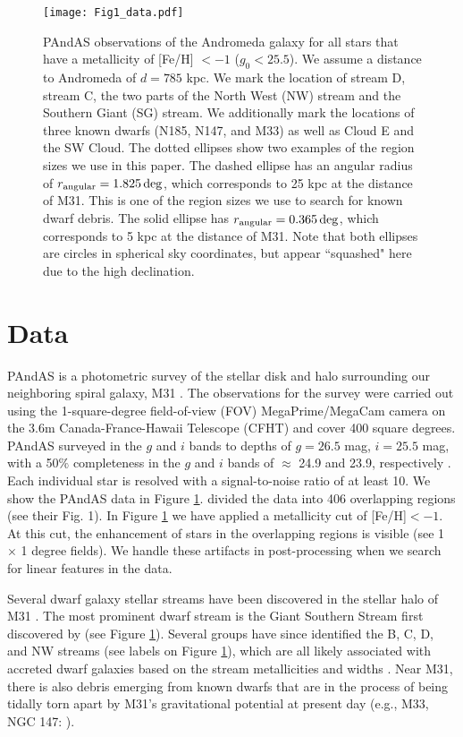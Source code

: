 \documentclass[twocolumn]{aastex631}
\begin{document}
\begin{figure}[htp]
\centerline{\texttt{[image: Fig1\_data.pdf]}}
\caption{PAndAS observations of the Andromeda galaxy for all stars that have a metallicity of [Fe/H] $<-1$ ($g_0 < 25.5$).  We assume a distance to Andromeda of $d = 785$ kpc.  We mark the location of stream D, stream C, the two parts of the North West (NW) stream and the Southern Giant (SG) stream. We additionally mark the locations of three known dwarfs (N185, N147, and M33) as well as Cloud E and the SW Cloud. The dotted ellipses show two examples of the region sizes we use in this paper. The dashed ellipse has an angular radius of $r_{\rm angular} = 1.825 \deg$, which corresponds to 25 kpc at the distance of M31.  This is one of the region sizes we use to search for known dwarf debris. The solid ellipse has $r_{\rm angular} = 0.365 \deg$, which corresponds to 5 kpc at the distance of M31. Note that both ellipses are circles in spherical sky coordinates, but appear ``squashed" here due to the high declination. 
}
\label{fig:m31}
\end{figure}

\section{Data}\label{sec:data}
PAndAS is a photometric survey of the stellar disk and halo surrounding our neighboring spiral galaxy, M31 \citep{mcconnachie2009,McConnachie18}. The observations for the survey were carried out using the 1-square-degree field-of-view (FOV) MegaPrime/MegaCam camera on the 3.6m Canada-France-Hawaii Telescope (CFHT) and cover 400 square degrees. PAndAS surveyed in the $g$ and $i$ bands to
depths of $g = 26.5$ mag, $i = 25.5$ mag, with a 50$\%$ completeness in the $g$ and $i$ bands of $\approx$ 24.9 and 23.9, respectively \citep[see Figure 4 in][]{martin16}. Each individual star is resolved with a signal-to-noise ratio of at least 10. We show the PAndAS data \citep[][]{ibata14} in Figure \ref{fig:m31}. \citet{ibata14} divided the data into 406 overlapping regions (see their Fig. 1). In Figure \ref{fig:m31} we have applied a metallicity cut of [Fe/H]$< -1 $. At this cut, the enhancement of stars in the overlapping regions is visible (see 1 $\times$ 1 degree fields). We handle these artifacts in post-processing when we search for linear features in the data.

Several dwarf galaxy stellar streams have been discovered in the stellar halo of M31 \citep[e.g.,][]{ibata07,mcconnachie2009,ibata14}. The most prominent dwarf stream is the Giant Southern Stream first discovered by \citet{ibata01} (see Figure \ref{fig:m31}). Several groups have since identified the B, C, D, and NW streams (see labels on Figure \ref{fig:m31}), which are all likely associated with accreted dwarf galaxies based on the stream metallicities and widths \citep[see e.g.,][]{chapman08, gilbert09}. Near M31, there is also debris emerging from known dwarfs that are in the process of being tidally torn apart by M31's gravitational potential at present day (e.g., M33, NGC 147: \citealt{denja14}). 
\end{document}
